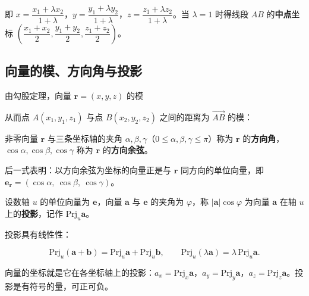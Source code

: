 即 $x=\dfrac{x_1+\lambda x_2}{1+\lambda}$，$y=\dfrac{y_1+\lambda y_2}{1+\lambda}$，$z=\dfrac{z_1+\lambda z_2}{1+\lambda}$。当 $\lambda=1$ 时得线段 $AB$ 的\textbf{中点}坐标 $\left(\dfrac{x_1+x_2}{2},\dfrac{y_1+y_2}{2},\dfrac{z_1+z_2}{2}\right)$。

\subsection{向量的模、方向角与投影}

由勾股定理，向量 $\boldsymbol{r}=(x,y,z)$ 的模


从而点 $A(x_1,y_1,z_1)$ 与点 $B(x_2,y_2,z_2)$ 之间的距离为 $\overrightarrow{AB}$ 的模：


\begin{definition}
非零向量 $\boldsymbol{r}$ 与三条坐标轴的夹角 $\alpha,\beta,\gamma$（$0\le\alpha,\beta,\gamma\le\pi$）称为 $\boldsymbol{r}$ 的\textbf{方向角}，$\cos\alpha,\cos\beta,\cos\gamma$ 称为 $\boldsymbol{r}$ 的\textbf{方向余弦}。
\end{definition}



后一式表明：以方向余弦为坐标的向量正是与 $\boldsymbol{r}$ 同方向的单位向量，即
$\boldsymbol{e}_{\boldsymbol{r}}=(\cos\alpha,\ \cos\beta,\ \cos\gamma)$。

\begin{definition}
设数轴 $u$ 的单位向量为 $\boldsymbol{e}$，向量 $\boldsymbol{a}$ 与 $\boldsymbol{e}$ 的夹角为 $\varphi$，称 $|\boldsymbol{a}|\cos\varphi$ 为向量 $\boldsymbol{a}$ 在轴 $u$ 上的\textbf{投影}，记作 $\mathrm{Prj}_u\boldsymbol{a}$。
\end{definition}

投影具有线性性：

\[
\mathrm{Prj}_u(\boldsymbol{a}+\boldsymbol{b})=\mathrm{Prj}_u\boldsymbol{a}+\mathrm{Prj}_u\boldsymbol{b},\qquad
\mathrm{Prj}_u(\lambda\boldsymbol{a})=\lambda\,\mathrm{Prj}_u\boldsymbol{a}.
\]

向量的坐标就是它在各坐标轴上的投影：$a_x=\mathrm{Prj}_x\boldsymbol{a}$，$a_y=\mathrm{Prj}_y\boldsymbol{a}$，$a_z=\mathrm{Prj}_z\boldsymbol{a}$。投影是有符号的量，可正可负。

